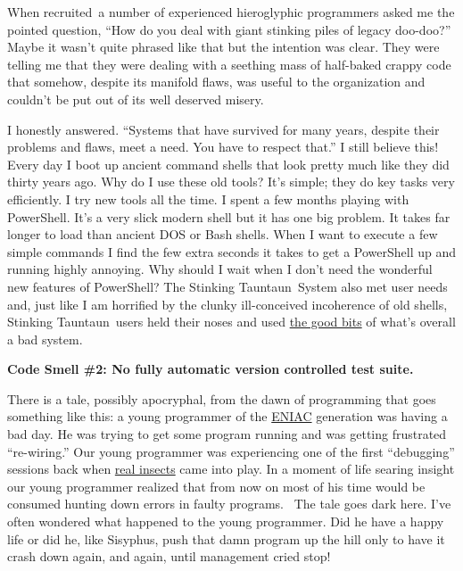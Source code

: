 When recruited~a number of experienced hieroglyphic programmers asked me
the pointed question, ``How do you deal with giant stinking piles of
legacy doo-doo?'' Maybe it wasn't quite phrased like that but the
intention was clear. They were telling me that they were dealing with a
seething mass of half-baked crappy code that somehow, despite its
manifold flaws, was useful to the organization and couldn't be put out
of its well deserved misery.

I honestly answered. ``Systems that have survived for many years,
despite their problems and flaws, meet a need. You have to respect
that.'' I still believe this! Every day I boot up ancient command
shells that look pretty much like they did thirty years ago. Why do I
use these old tools? It's simple; they do key tasks very efficiently. I
try new tools all the time. I spent a few months playing with
PowerShell. It's a very slick modern shell but it has one big problem.
It takes far longer to load than ancient DOS or Bash shells. When I want
to execute a few simple commands I find the few extra seconds it takes
to get a PowerShell up and running highly annoying. Why should I wait
when I don't need the wonderful new features of PowerShell? The
Stinking Tauntaun~System also met user needs and, just like I am
horrified by the clunky ill-conceived incoherence of old shells,
Stinking Tauntaun~users held their noses and used
\href{https://www.youtube.com/watch?v=wPiHQ37gXnE}{the good bits} of
what's overall a bad system.

\medskip
\noindent\textbf{Code Smell \#2: No fully automatic version controlled test
suite.}
\medskip

There is a tale, possibly apocryphal, from the dawn of programming that
goes something like this: a young programmer of the
\href{http://en.wikipedia.org/wiki/ENIAC}{ENIAC} generation was having a
bad day. He was trying to get some program running and was getting
frustrated ``re-wiring.'' Our young programmer was experiencing one of
the first ``debugging'' sessions back when
\href{http://en.wikipedia.org/wiki/Grace_Hopper}{real insects} came into
play. In a moment of life searing insight our young programmer realized
that from now on most of his time would be consumed hunting down errors
in faulty programs.~ The tale goes dark here. I've often wondered what
happened to the young programmer. Did he have a happy life or did he,
like Sisyphus, push that damn program up the hill only to have it crash
down again, and again, until management cried stop!

